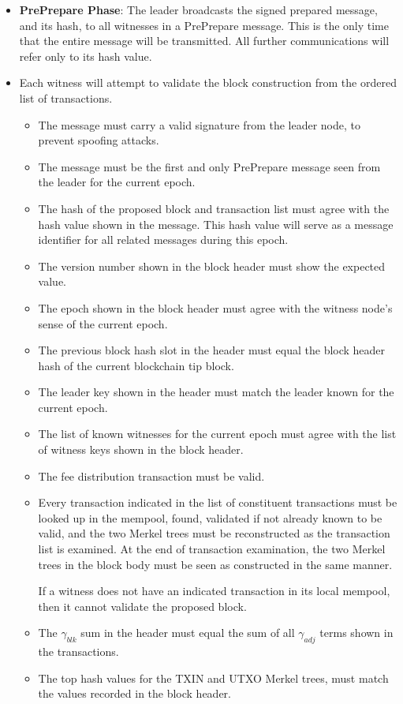 \documentclass[a4paper, 10pt, conference]{ieeeconf}
\begin{document}
\begin{itemize}
\item{\textbf{PrePrepare Phase}: The leader broadcasts the signed prepared message, and its hash, to all witnesses in a PrePrepare message. This is the only time that the entire message will be transmitted. All further communications will refer only to its hash value.}
\item{Each witness will attempt to validate the block construction from the ordered list of transactions. 
\begin{itemize}
\item{The message must carry a valid signature from the leader node, to prevent spoofing attacks.}
\item{The message must be the first and only PrePrepare message seen from the leader for the current epoch.}
\item{The hash of the proposed block and transaction list must agree with the hash value shown in the message. This hash value will serve as a message identifier for all related messages during this epoch.}
\item{The version number shown in the block header must show the expected value.}
\item{The epoch shown in the block header must agree with the witness node's sense of the current epoch.}
\item{The previous block hash slot in the header must equal the block header hash of the current blockchain tip block.}
\item{The leader key shown in the header must match the leader known for the current epoch.}
\item{The list of known witnesses for the current epoch must agree with the list of witness keys shown in the block header.}
\item{The fee distribution transaction must be valid.}
\item{Every transaction indicated in the list of constituent transactions must be looked up in the mempool, found, validated if not already known to be valid, and the two Merkel trees must be reconstructed as the transaction list is examined. At the end of transaction examination, the two Merkel trees in the block body must be seen as constructed in the same manner.

If a witness does not have an indicated transaction in its local mempool, then it cannot validate the proposed block.}
\item{The $\gamma_{blk}$ sum in the header must equal the sum of all $\gamma_{adj}$ terms shown in the transactions.}
\item{The top hash values for the TXIN and UTXO Merkel trees, must match the values recorded in the block header.}
\end{itemize}

}
\end{itemize}
\end{document}
